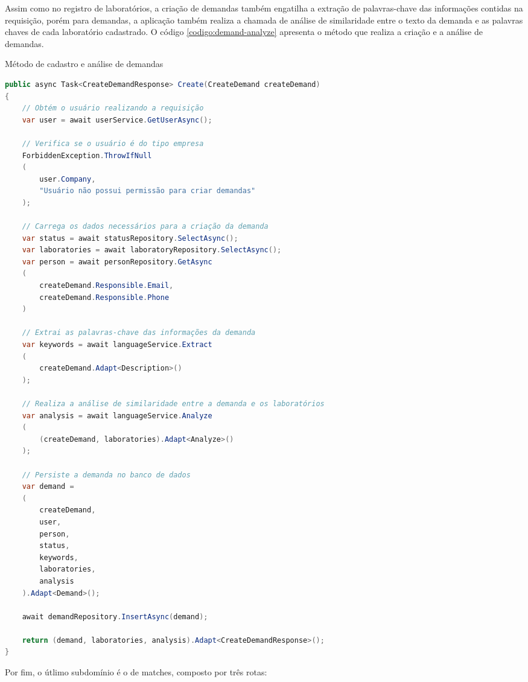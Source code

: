 Assim como no registro de laboratórios, a criação de demandas também engatilha a extração de palavras-chave das informações contidas na requisição, porém para demandas, a aplicação também realiza a chamada de análise de similaridade entre o texto da demanda e as palavras chaves de cada laboratório cadastrado. O código \ref{codigo:demand-analyze} apresenta o método que realiza a criação e a análise de demandas.

\begin{sourcecode}[H]
  \caption{\label{codigo:demand-analyze}Método de cadastro e análise de demandas}
  \begin{lstlisting}[frame=single, language=Java]
public async Task<CreateDemandResponse> Create(CreateDemand createDemand)
{
    // Obtém o usuário realizando a requisição
    var user = await userService.GetUserAsync();

    // Verifica se o usuário é do tipo empresa
    ForbiddenException.ThrowIfNull
    (
        user.Company, 
        "Usuário não possui permissão para criar demandas"
    );

    // Carrega os dados necessários para a criação da demanda
    var status = await statusRepository.SelectAsync();
    var laboratories = await laboratoryRepository.SelectAsync();
    var person = await personRepository.GetAsync
    (
        createDemand.Responsible.Email, 
        createDemand.Responsible.Phone
    )

    // Extrai as palavras-chave das informações da demanda
    var keywords = await languageService.Extract
    (
        createDemand.Adapt<Description>()
    );

    // Realiza a análise de similaridade entre a demanda e os laboratórios
    var analysis = await languageService.Analyze
    (
        (createDemand, laboratories).Adapt<Analyze>()
    );

    // Persiste a demanda no banco de dados
    var demand = 
    (
        createDemand, 
        user, 
        person, 
        status, 
        keywords, 
        laboratories, 
        analysis
    ).Adapt<Demand>();

    await demandRepository.InsertAsync(demand);

    return (demand, laboratories, analysis).Adapt<CreateDemandResponse>();
}
\end{lstlisting}
  \fonte{}
\end{sourcecode}

Por fim, o útlimo subdomínio é o de matches, composto por três rotas:

